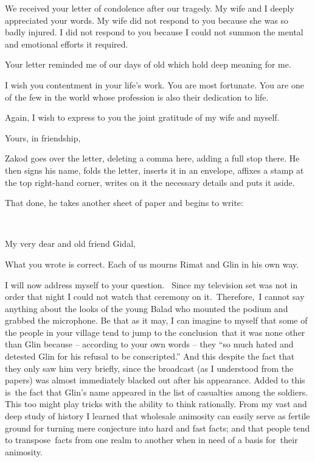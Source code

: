\documentclass[twoside,11pt]{book}
\begin{document}
We received your letter of condolence after our tragedy. My wife and I deeply appreciated your words. My wife did not
respond to you because she was so badly injured. I did not respond to you because I could not summon the mental and
emotional efforts it required.

Your letter reminded me of our days of old which hold deep meaning for me.\ 

I wish you contentment in your life's work. You are most fortunate. You are one of the few in the world whose profession
is also their dedication to life.

Again, I wish to express to you the joint gratitude of my wife and myself.

Yours, in friendship,

Zakod goes over the letter, deleting a comma here, adding a full stop there. He then signs his name, folds the letter,
inserts it in an envelope, affixes a stamp at the top right-hand corner, writes on it the necessary details and puts it
aside.

That done, he takes another sheet of paper and begins to write:

~

My very dear and old friend Gidal,\ 

What you wrote is correct. Each of us mourns Rimat and Glin in his own way.

I will now address myself to your question. ~Since my television set was not in order that night I could not watch that
ceremony on it.\ Therefore,\ I cannot say anything about the looks of the young Balad who mounted the podium and
grabbed the microphone. Be that as it may, I can imagine to myself that some of the people in your village tend to jump
to the conclusion~that it was none other than Glin because -- according to your own words -- they ``so
much hated and detested Glin for his refusal to be conscripted.'' And this despite the fact that they only
saw him very briefly, since the broadcast (as I understood from the papers) was almost immediately blacked out after
his appearance. Added to this is~the fact that Glin's name appeared in the list of casualties among the soldiers. This
too might play tricks with the ability to think rationally. From my vast and deep study of history I learned that
wholesale animosity can easily serve as fertile ground for turning mere conjecture into hard and fast facts; and that
people tend to transpose~facts from one realm to another when in need of a basis for~their animosity.
\end{document}

